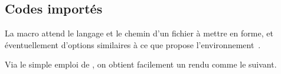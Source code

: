 \documentclass{tutodoc}
\begin{document}
\subsection{Codes importés}

La macro  attend le langage et le chemin d'un fichier à mettre en forme, et éventuellement d'options similaires à ce que propose l'environnement \,.


\begin{tdocexa}
	Via le simple emploi de , on obtient facilement un rendu comme le suivant.

\end{tdocexa}


\begin{tdocexa}
	\leavevmode
\end{tdocexa}
\end{document}
